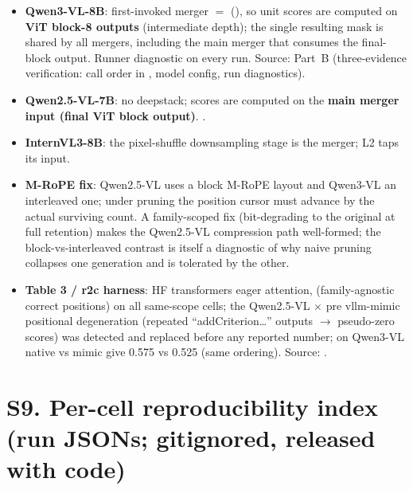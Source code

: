 \documentclass[sigconf,review,anonymous]{acmart}
\begin{document}
\begin{itemize}
  \item \textbf{Qwen3-VL-8B}: first-invoked merger $=$
     (), so unit scores are computed on \textbf{ViT block-8 outputs}
    (intermediate depth); the single resulting mask is shared by all mergers,
    including the main merger that consumes the final-block output. Runner
    diagnostic  on every run. Source:
     Part~B (three-evidence verification:
    call order in , model config, run
    diagnostics).
  \item \textbf{Qwen2.5-VL-7B}: no deepstack; scores are computed on the
    \textbf{main merger input (final ViT block output)}.
    .
  \item \textbf{InternVL3-8B}: the pixel-shuffle downsampling stage is the
    merger; L2 taps its input.
  \item \textbf{M-RoPE fix}: Qwen2.5-VL uses a block M-RoPE layout and Qwen3-VL
    an interleaved one; under pruning the position cursor must advance by the
    actual surviving count. A family-scoped fix (bit-degrading to the original
    at full retention) makes the Qwen2.5-VL compression path well-formed; the
    block-vs-interleaved contrast is itself a diagnostic of why naive pruning
    collapses one generation and is tolerated by the other.
  \item \textbf{Table 3 / r2c harness}: HF transformers eager attention,
     (family-agnostic correct positions) on all same-scope
    cells; the Qwen2.5-VL $\times$ pre vllm-mimic positional degeneration
    (repeated ``addCriterion\ldots'' outputs $\to$ pseudo-zero scores) was
    detected and replaced before any reported number; on Qwen3-VL native vs
    mimic give 0.575 vs 0.525 (same ordering). Source:
    .
\end{itemize}

\section*{S9. Per-cell reproducibility index (run JSONs; gitignored, released with code)}
\end{document}

